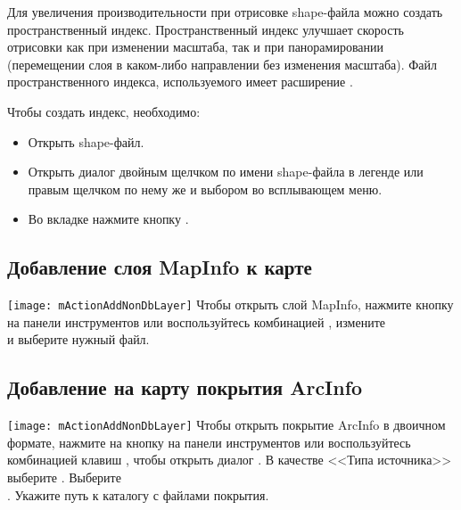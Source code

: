 Для увеличения производительности при отрисовке shape-файла можно создать
пространственный индекс. Пространственный индекс 
улучшает скорость отрисовки как при изменении масштаба, так и при
панорамировании (перемещении слоя в каком-либо направлении без изменения
масштаба). Файл пространственного индекса, используемого \qg имеет
расширение .

Чтобы создать индекс, необходимо:

\begin{itemize}[label=--]
\item Открыть shape-файл.
\item Открыть диалог  двойным щелчком по имени
shape-файла в легенде или правым щелчком по нему же и выбором
 во всплывающем меню.
\item Во вкладке  нажмите кнопку .
\end{itemize}

\subsection{Добавление слоя MapInfo к карте}

\texttt{[image: mActionAddNonDbLayer]} Чтобы открыть слой
MapInfo, нажмите кнопку  на панели инструментов или воспользуйтесь комбинацией
, измените \\
и выберите нужный файл.

\subsection{Добавление на карту покрытия ArcInfo}

\texttt{[image: mActionAddNonDbLayer]} Чтобы открыть покрытие ArcInfo
в двоичном формате, нажмите на кнопку
 на панели
инструментов или воспользуйтесь комбинацией клавиш ,
чтобы открыть диалог . В качестве
<<Типа источника>> выберите . Выберите \\
. Укажите путь к каталогу
с файлами покрытия.

